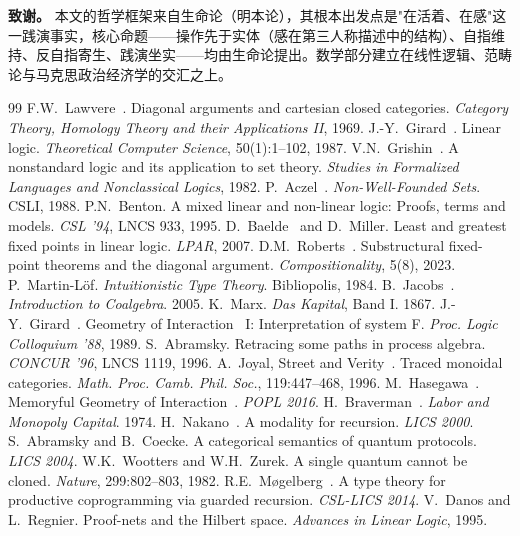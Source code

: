\documentclass[11pt,a4paper]{article}
\begin{document}
\vspace{1em}
\noindent\textbf{致谢。} 本文的哲学框架来自生命论（明本论），其根本出发点是"在活着、在感"这一践演事实，核心命题——操作先于实体（感在第三人称描述中的结构）、自指维持、反自指寄生、践演坐实——均由生命论提出。数学部分建立在线性逻辑、范畴论与马克思政治经济学的交汇之上。

\begin{thebibliography}{99}
 F.W.~Lawvere~\cite{lawvere69}. Diagonal arguments and cartesian closed categories. \textit{Category Theory, Homology Theory and their Applications II}, 1969.
 J.-Y.~Girard~\cite{girard87}. Linear logic. \textit{Theoretical Computer Science}, 50(1):1--102, 1987.
 V.N.~Grishin~\cite{grishin82}. A nonstandard logic and its application to set theory. \textit{Studies in Formalized Languages and Nonclassical Logics}, 1982.
 P.~Aczel~\cite{aczel88}. \textit{Non-Well-Founded Sets}. CSLI, 1988.
 P.N.~Benton. A mixed linear and non-linear logic: Proofs, terms and models. \textit{CSL '94}, LNCS 933, 1995.
 D.~Baelde~\cite{baelde07} and D.~Miller. Least and greatest fixed points in linear logic. \textit{LPAR}, 2007.
 D.M.~Roberts~\cite{roberts23}. Substructural fixed-point theorems and the diagonal argument. \textit{Compositionality}, 5(8), 2023.
 P.~Martin-L\"of. \textit{Intuitionistic Type Theory}. Bibliopolis, 1984.
 B.~Jacobs~\cite{jacobs05}. \textit{Introduction to Coalgebra}. 2005.
 K.~Marx. \textit{Das Kapital}, Band I. 1867.
 J.-Y.~Girard~\cite{girard87}. Geometry of Interaction~\cite{girard89} I: Interpretation of system F. \textit{Proc. Logic Colloquium '88}, 1989.
 S.~Abramsky. Retracing some paths in process algebra. \textit{CONCUR '96}, LNCS 1119, 1996.
 A.~Joyal, Street and Verity~\cite{jsv96}. Traced monoidal categories. \textit{Math. Proc. Camb. Phil. Soc.}, 119:447--468, 1996.
 M.~Hasegawa~\cite{hasegawa16}. Memoryful Geometry of Interaction~\cite{girard89}. \textit{POPL 2016}.
 H.~Braverman~\cite{braverman74}. \textit{Labor and Monopoly Capital}. 1974.
 H.~Nakano~\cite{nakano00}. A modality for recursion. \textit{LICS 2000}.
 S.~Abramsky and B.~Coecke. A categorical semantics of quantum protocols. \textit{LICS 2004}.
 W.K.~Wootters and W.H.~Zurek. A single quantum cannot be cloned. \textit{Nature}, 299:802--803, 1982.
 R.E.~M\o{}gelberg~\cite{mogelberg14}. A type theory for productive coprogramming via guarded recursion. \textit{CSL-LICS 2014}.
 V.~Danos and L.~Regnier. Proof-nets and the Hilbert space. \textit{Advances in Linear Logic}, 1995.


\end{thebibliography}
\end{document}
